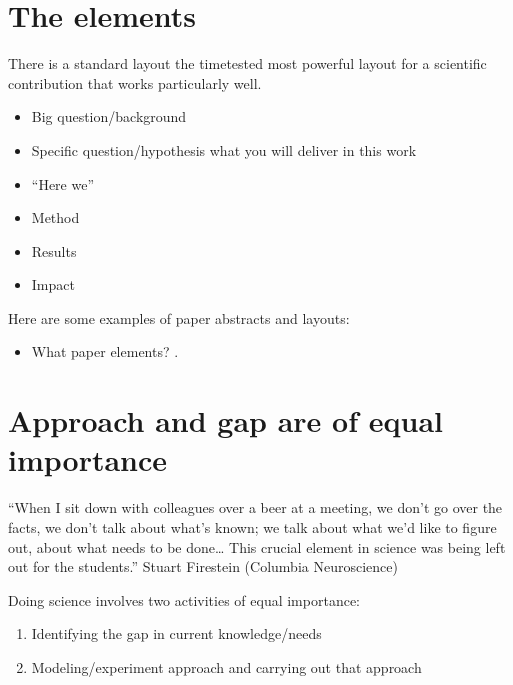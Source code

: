 \documentclass[letterpaper,10pt,english]{sphinxmanual}
\begin{document}
\section{The elements}
\label{\detokenize{02Elements:the-elements}}
\sphinxAtStartPar
There is a standard layout \textendash{} the time\sphinxhyphen{}tested most powerful layout \textendash{} for a  scientific contribution that works particularly well.
\begin{itemize}
\item {} 
\sphinxAtStartPar
Big question/background

\item {} 
\sphinxAtStartPar
Specific question/hypothesis \textendash{} what you will deliver in this work

\item {} 
\sphinxAtStartPar
“Here we”

\item {} 
\sphinxAtStartPar
Method

\item {} 
\sphinxAtStartPar
Results

\item {} 
\sphinxAtStartPar
Impact

\end{itemize}

\sphinxAtStartPar
Here are some examples of paper abstracts and layouts:
\begin{itemize}
\item {} 
\sphinxAtStartPar
What paper elements? .

\end{itemize}


\section{Approach and gap are of equal importance}
\label{\detokenize{02Elements:approach-and-gap-are-of-equal-importance}}
\sphinxAtStartPar
“When I sit down with colleagues over a beer at a meeting, we don’t go over the facts, we don’t talk about what’s known; we talk about what we’d like to figure out, about what needs to be done… This crucial element in science was being left out for the students.” \sphinxhyphen{} Stuart Firestein (Columbia Neuroscience)

\sphinxAtStartPar
Doing science involves two activities of equal importance:
\begin{enumerate}
%
\item {} 
\sphinxAtStartPar
Identifying the gap in current knowledge/needs

\item {} 
\sphinxAtStartPar
Modeling/experiment approach and carrying out that approach

\end{enumerate}
\end{document}
